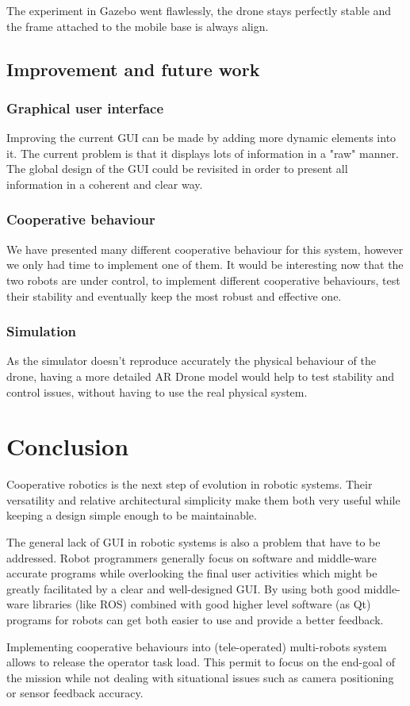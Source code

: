 \documentclass[11pt,a4paper]{article}
\begin{document}
The experiment in Gazebo went flawlessly, the drone stays perfectly stable and the frame attached to the 
mobile base is always align.

\subsection{Improvement and future work}
\subsubsection{Graphical user interface}
Improving the current GUI can be made by adding more dynamic elements into it. The current 
problem is
that it displays lots of information in a "raw" manner. The global design of the GUI could be 
revisited in
order to present all information  in a coherent and clear way.

\subsubsection{Cooperative behaviour}
We have presented many different cooperative behaviour for this system, however we only had 
time to implement one of them. It would be interesting now that the two robots are under 
control, to implement
different cooperative behaviours, test their stability and eventually keep the most robust and 
effective
one.

\subsubsection{Simulation}
As the simulator doesn't reproduce accurately the physical behaviour of the drone, having a 
more detailed AR Drone model would help to test stability and control issues, without having 
to use the real physical system.

\clearpage
\section{Conclusion}
Cooperative robotics is the next step of evolution in robotic systems.
Their versatility and relative architectural simplicity make them both very useful while
keeping a design simple enough to be maintainable.

The general lack of GUI in robotic systems is also a problem that have to be addressed. 
Robot programmers generally focus on software and middle-ware accurate programs while 
overlooking the final user activities which might be greatly facilitated by a clear and 
well-designed GUI.
By using both good middle-ware libraries (like ROS) combined with good higher level
software (as Qt) programs for robots can get both easier to use and provide a better 
feedback.

Implementing cooperative behaviours into (tele-operated) multi-robots system allows to release 
the operator task load. This permit to focus on the end-goal of the mission while not dealing 
with situational issues such as camera positioning or sensor feedback accuracy.


\end{document}
